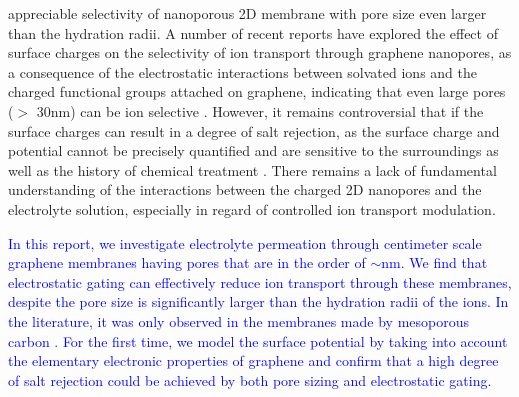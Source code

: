 appreciable selectivity of nanoporous 2D membrane with pore size even
larger than the hydration radii.
A number of recent reports have explored the effect of surface charges
on the selectivity of ion transport through graphene nanopores, as a
consequence of the electrostatic interactions between solvated ions
and the charged functional groups attached on graphene, indicating
that even large pores ($>$ 30nm) can be ion selective
\cite{Rollings_2016_gating,Surwade_2014_carbon_electrochemical_ion}. However, it remains controversial
that if the surface charges can result in a degree of salt rejection,
as the surface charge and potential cannot be precisely quantified and
are sensitive to the surroundings as well as the history of chemical
treatment \cite{Li_2008_gr_suspension}. There remains a lack of fundamental
understanding of the interactions between the charged 2D nanopores and
the electrolyte solution, especially in regard of controlled ion
transport modulation.


\textcolor{blue}{ In this report, we investigate electrolyte
  permeation through centimeter scale graphene membranes having pores
  that are in the order of $\sim{}$\unit[20]{nm}. We find that
  electrostatic gating can effectively reduce ion transport through
  these membranes, despite the pore size is significantly larger than
  the hydration radii of the ions. In the literature, it was only
  observed in the membranes made by mesoporous carbon
  \cite{Surwade_2014_carbon_electrochemical_ion}. For the first time, we model the surface
  potential by taking into account the elementary electronic
  properties of graphene and confirm that a high degree of salt
  rejection could be achieved by both pore sizing and electrostatic
  gating. }

